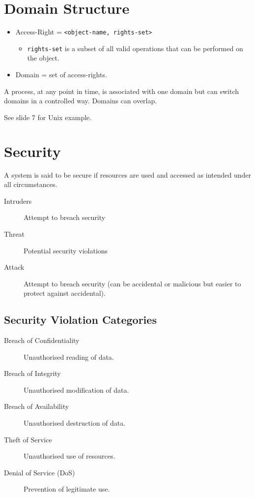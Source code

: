 \documentclass[11pt]{article}
\begin{document}
\section{Domain Structure}
\label{sec:orgd318d31}
\begin{itemize}
\item Access-Right = \texttt{<object-name, rights-set>}
\begin{itemize}
\item \texttt{rights-set} is a subset of all valid operations that can be performed on the object.
\end{itemize}
\item Domain = set of access-rights.
\end{itemize}
A process, at any point in time, is associated with one domain but can switch domains in a controlled way.
Domains can overlap.

See slide 7 for Unix example.

\section{Security}
\label{sec:org18a8e74}
A system is said to be secure if resources are used and accessed as intended under all circumstances.
\begin{description}
\item[{Intruders}] Attempt to breach security
\item[{Threat}] Potential security violations
\item[{Attack}] Attempt to breach security (can be accidental or malicious but easier to protect against accidental).
\end{description}

\subsection{Security Violation Categories}
\label{sec:org5c5aee5}
\begin{description}
\item[{Breach of Confidentiality}] Unauthorised reading of data.
\item[{Breach of Integrity}] Unauthorised modification of data.
\item[{Breach of Availability}] Unauthorised destruction of data.
\item[{Theft of Service}] Unauthorised use of resources.
\item[{Denial of Service (DoS)}] Prevention of legitimate use.
\end{description}
\end{document}
